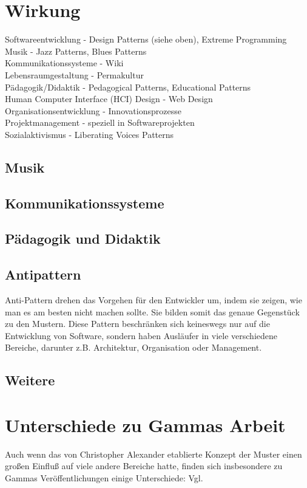 \documentclass[fontsize=11pt,a4paper,final]{scrreprt}[2003/01/01]
\begin{document}
\section{Wirkung}
Softwareentwicklung - Design Patterns (siehe oben), Extreme Programming \\
Musik - Jazz Patterns, Blues Patterns \\
Kommunikationssysteme - Wiki \\
Lebensraumgestaltung - Permakultur \\
Pädagogik/Didaktik - Pedagogical Patterns, Educational Patterns \\
Human Computer Interface (HCI) Design - Web Design \\
Organisationsentwicklung - Innovationsprozesse \\
Projektmanagement - speziell in Softwareprojekten \\
Sozialaktivismus - Liberating Voices Patterns \\
\subsection{Musik}

\subsection{Kommunikationssysteme}
\subsection{Pädagogik und Didaktik}

\subsection{Antipattern}
Anti-Pattern drehen das Vorgehen für den Entwickler um, indem sie zeigen, wie man es am besten nicht machen sollte. Sie bilden somit das genaue Gegenstück zu den Mustern. Diese Pattern beschränken sich keineswegs nur auf die Entwicklung von Software, sondern haben Ausläufer in viele verschiedene Bereiche, darunter z.B. Architektur, Organisation oder Management. \cite{AntiPatternsCatalog}

\subsection{Weitere}

\section{Unterschiede zu Gammas Arbeit}
Auch wenn das von Christopher Alexander etablierte Konzept der Muster einen großen Einfluß auf viele andere Bereiche hatte, finden sich insbesondere zu Gammas Veröffentlichungen einige Unterschiede: Vgl. \cite[S. 438 - 439]{gamma2004}
\end{document}
